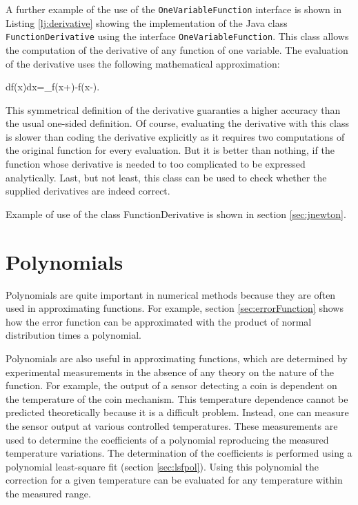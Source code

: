 \documentclass[twoside]{book}
\begin{document}
A further example of the use of the {\tt OneVariableFunction}
interface is shown in Listing \ref{lj:derivative} showing the
implementation of the Java class {\tt FunctionDerivative} using
the interface {\tt OneVariableFunction}. This class allows the
computation of the derivative of any function of one variable. The
evaluation of the derivative uses the following mathematical
approximation:

\begin{mainEquation}
\label{eq:derivative} {df\left(x\right)\over dx}=\lim_{\epsilon{}}{f\left(x+\epsilon\right)-f\left(x-\epsilon\right)\epsilon}.
\end{mainEquation}
This symmetrical definition of the derivative guaranties a higher
accuracy than the usual one-sided definition. Of course,
evaluating the derivative with this class is slower than coding
the derivative explicitly as it requires two computations of the
original function for every evaluation. But it is better than
nothing, if the function whose derivative is needed to too
complicated to be expressed analytically. Last, but not least,
this class can be used to check whether the supplied derivatives
are indeed correct.

Example of use of the class FunctionDerivative is shown in section
\ref{sec:jnewton}.
\begin{listing}
\label{lj:derivative}

\end{listing}

\section{Polynomials}
\label{sec:polynomial}
 Polynomials are quite important in
numerical methods because they are often used in approximating
functions. For example, section \ref{sec:errorFunction} shows how
the error function can be approximated with the product of normal
distribution times a polynomial.

Polynomials are also useful in approximating functions, which are
determined by experimental measurements in the absence of any
theory on the nature of the function. For example, the output of a
sensor detecting a coin is dependent on the temperature of the
coin mechanism. This temperature dependence cannot be predicted
theoretically because it is a difficult problem. Instead, one can
measure the sensor output at various controlled temperatures.
These measurements are used to determine the coefficients of a
polynomial reproducing the measured temperature variations. The
determination of the coefficients is performed using a polynomial
least-square fit (\cf section \ref{sec:lsfpol}). Using this
polynomial the correction for a given temperature can be evaluated
for any temperature within the measured range.
\end{document}
